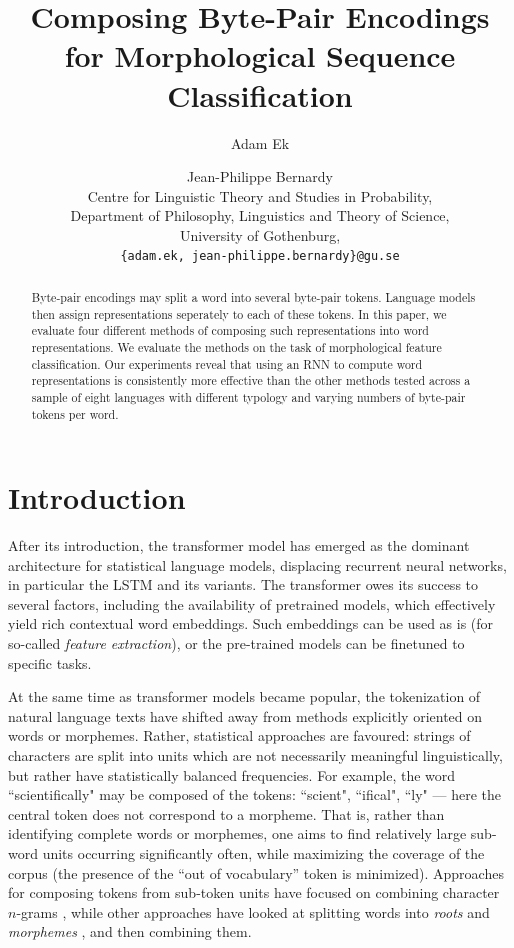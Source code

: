\documentclass[11pt]{article}
\title{Composing Byte-Pair Encodings for Morphological Sequence Classification}
\author{Adam Ek \and Jean-Philippe Bernardy\\
	Centre for Linguistic Theory and Studies in Probability,\\
	Department of Philosophy, Linguistics and Theory of Science,\\
	University of Gothenburg,\\
	\texttt{\{adam.ek, jean-philippe.bernardy\}@gu.se}}
\date{}
\newcommand\citep{\cite}
\begin{document}
\maketitle
\begin{abstract}
  Byte-pair encodings may split a word into several byte-pair tokens.
  Language models then assign representations seperately to each of
  these tokens.  In this paper, we evaluate four different methods of
  composing such representations into word representations. We
  evaluate the methods on the task of morphological feature
  classification. Our experiments reveal that using an RNN to compute
  word representations is consistently more effective than the other
  methods tested across a sample of eight languages with different
  typology and varying numbers of byte-pair tokens per word.
\end{abstract}

	\section{Introduction}
	\label{intro}

            After its introduction, the transformer model
     \citep{vaswani2017attention} has emerged as the dominant
     architecture for statistical language models, displacing
     recurrent neural networks, in particular the LSTM and its
     variants. The transformer owes its success to several factors,
     including the availability of pretrained models, which
     effectively yield rich contextual word embeddings. Such
     embeddings can be used as is (for so-called \emph{feature extraction}),
     or the pre-trained models can be finetuned to specific
     tasks.

    	At the same time as transformer models became popular, the
     tokenization of natural language texts have shifted away from
     methods explicitly oriented on words or morphemes. Rather,
     statistical approaches are favoured: strings of
     characters are split into units which are not necessarily meaningful
     linguistically, but rather have statistically balanced
     frequencies. For example, the word ``scientifically" may be
     composed of the tokens: ``scient", ``ifical", ``ly" --- here the
     central token does not correspond to a morpheme.
             That is, rather than identifying complete words or
     morphemes, one aims to find relatively large sub-word units
     occurring significantly often, while maximizing the coverage of
     the corpus (the presence of the ``out of vocabulary'' token is
     minimized). Approaches for composing tokens from sub-token units
     have focused on combining character $n$-grams
     \citep{bojanowski2017enriching}, while other approaches have
     looked at splitting words into \textit{roots} and
     \textit{morphemes}
     \citep{el2012orthographic,chaudhary2018adapting,xu2017implicitly},
     and then combining them.
\end{document}
